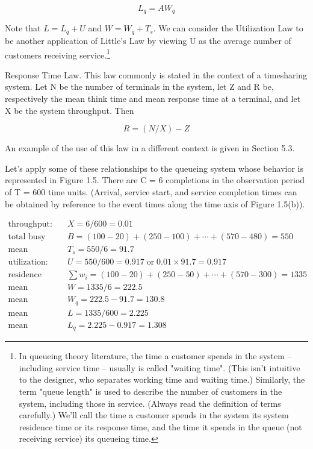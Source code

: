 \begin{equation}
L_q = A W_q \tag{1.12}
\end{equation}

Note that \ensuremath{L = L_q + U} and \ensuremath{W = W_q + T_s}. We can consider the Utilization Law to be another
application of Little's Law by viewing U as the average number of customers
receiving service.\footnote{In queueing theory literature, the time a customer
spends in the system -- including service time -- usually is called "waiting
time". (This isn't intuitive to the designer, who separates working time and
waiting time.) Similarly, the term "queue length" is used to describe the
number of customers in the system, including those in service. (Always read the
definition of terms carefully.) We'll call the time a customer spends in the
system its system residence time or its response time, and the time it spends
in the queue (not receiving service) its queueing time.}

Response Time Law. This law commonly is stated in the context of a timesharing
system. Let N be the number of terminals in the system, let Z and R be,
respectively the mean think time and mean response time at a terminal, and let
X be the system throughput. Then

\begin{equation}
R = (N/X) - Z \tag{1.13}
\end{equation}

An example of the use
of this law in a different context is given in Section 5.3.

Let's apply some of these relationships to the queueing system whose behavior
is represented in Figure 1.5. There are C = 6 completions in the observation
period of T = 600 time units. (Arrival, service start, and service completion
times can be obtained by reference to the event times along the time axis of
Figure 1.5(b)).

\begin{align*}
\text{throughput:} &\quad X = 6/600 = 0.01\\
\text{total busy time:} &\quad B = (100-20)+(250-100)+\cdots+(570-480) = 550\\
\text{mean service time:} &\quad T_s = 550/6 = 91.7\\
\text{utilization:} &\quad U = 550/600 = 0.917 \;\text{or}\; 0.01 \times 91.7 = 0.917\\
\text{residence time sum:} &\quad \sum w_i = (100-20)+(250-50)+\cdots+(570-300) = 1335\\
\text{mean residence time:} &\quad W = 1335/6 = 222.5\\
\text{mean queueing time:} &\quad W_q = 222.5 - 91.7 = 130.8\\
\text{mean number in system:} &\quad L = 1335/600 = 2.225\\
\text{mean number in queue:} &\quad L_q = 2.225 - 0.917 = 1.308
\end{align*}

